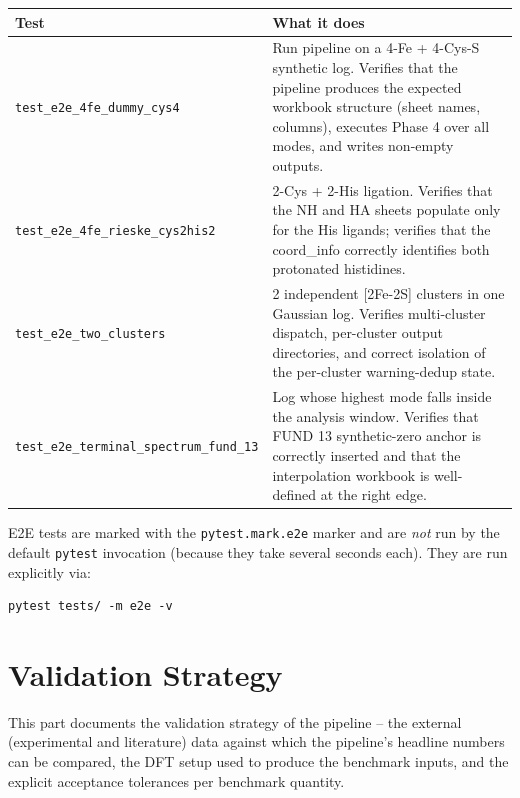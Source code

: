 \documentclass[10pt,a4paper,twoside]{article}
\newcommand{\fn}[1]{\texttt{#1}}
\begin{document}
\begin{longtable}{p{} p{}}
\toprule
\textbf{Test} & \textbf{What it does} \\
\midrule
\texttt{test\_e2e\_4fe\_dummy\_cys4}
 & Run pipeline on a 4-Fe + 4-Cys-S synthetic log. Verifies that
   the pipeline produces the expected workbook structure (sheet
   names, columns), executes Phase 4 over all modes, and writes
   non-empty outputs. \\
\texttt{test\_e2e\_4fe\_rieske\_cys2his2}
 & 2-Cys + 2-His ligation. Verifies that the NH and HA sheets
   populate only for the His ligands; verifies that the
   coord\_info correctly identifies both protonated histidines. \\
\texttt{test\_e2e\_two\_clusters}
 & 2 independent [2Fe-2S] clusters in one Gaussian log. Verifies
   multi-cluster dispatch, per-cluster output directories, and
   correct isolation of the per-cluster warning-dedup state. \\
\texttt{test\_e2e\_terminal\_spectrum\_fund\_13}
 & Log whose highest mode falls inside the analysis window.
   Verifies that FUND 13 synthetic-zero anchor is correctly
   inserted and that the interpolation workbook is well-defined
   at the right edge. \\
\bottomrule
\end{longtable}

E2E tests are marked with the \fn{pytest.mark.e2e} marker and are
\emph{not} run by the default \fn{pytest} invocation (because they
take several seconds each). They are run explicitly via:

\begin{lstlisting}[style=pycode]
pytest tests/ -m e2e -v
\end{lstlisting}

\part{Validation Strategy}
\label{part:validation}

This part documents the validation strategy of the pipeline -- the
external (experimental and literature) data against which the
pipeline's headline numbers can be compared, the DFT setup used to
produce the benchmark inputs, and the explicit acceptance
tolerances per benchmark quantity.
\end{document}
